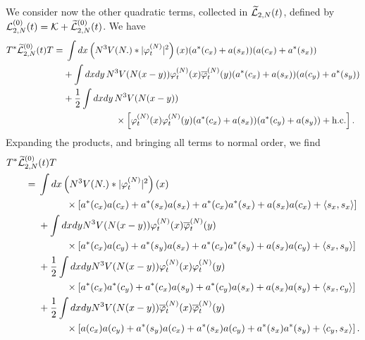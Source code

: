 \documentclass[11pt,a4paper]{article}
\newcommand{\wt}{\widetilde}
\newcommand{\cK}{{\cal K}}
\newcommand{\cL}{{\cal L}}
\begin{document}
We consider now the other quadratic terms, collected in $\wt{\cL}_{2,N} (t)$, defined by $\cL^{(0)}_{2,N} (t) = \cK + \wt{\cL}_{2,N}^{(0)} (t)$. 
We have
\[ \begin{split} 
T^* \wt{\cL}_{2,N}^{(0)} (t) T = & \; \int dx \left( N^3 V (N .) * |\varphi_t^{(N)}|^2 \right) (x) (a^* (c_x) + a(s_x)) (a(c_x) + a^* (s_x)) \\ & + \int dx dy \, N^3 V(N(x-y)) \varphi_t^{(N)} (x) \overline{\varphi}_t^{(N)} (y) (a^* (c_x) + a(s_x)) (a (c_y) + a^* (s_y)) \\ &+ \frac{1}{2} \int dx dy \, N^3 V(N (x-y)) \\
&\hspace{2cm} \times \left[  \varphi_t^{(N)} (x) \varphi_t^{(N)} (y) (a^* (c_x) + a(s_x)) (a^* (c_y) + a (s_y)) + \text{h.c.}  \right]. 
\end{split} \]
Expanding the products, and bringing all terms to normal order, we find
\begin{equation}\label{eq:T2T} \begin{split} 
T^*  \wt{\cL}_{2,N}^{(0)}& (t) T \\ =\; & \int dx \left(N^3 V (N .) * |\varphi_t^{(N)}|^2 \right) (x) \\ &\hspace{1cm}\times \left[  a^* (c_x) a (c_x) + a^* (s_x) a (s_x) + a^* (c_x) a^* (s_x) + a(s_x) a(c_x) + \langle s_x , s_x \rangle \right] \\
&+ \int dx dy N^3 V (N (x-y)) \varphi_t^{(N)} (x) \overline{\varphi}_t^{(N)} (y) \\ &\hspace{1cm}\times  \left[ a^* (c_x) a(c_y) + a^* (s_y) a(s_x) + a^* (c_x) a^* (s_y) + a(s_x) a(c_y) + \langle s_x , s_y \rangle \right] \\
&+ \frac{1}{2} \int dx dy N^3 V(N (x-y)) \varphi_t^{(N)} (x) \varphi_t^{(N)} (y) \\ &\hspace{1cm}\times \left[ a^* (c_x) a^* (c_y) + a^* (c_x) a(s_y) + a^* (c_y) a (s_x) + a(s_x) a(s_y) + \langle s_x , c_y \rangle \right] \\
&+ \frac{1}{2} \int dx dy N^3 V(N (x-y)) \overline{\varphi}_t^{(N)} (x) \overline{\varphi}_t^{(N)} (y) \\ &\hspace{1cm}\times \left[ a (c_x) a (c_y) + a^* (s_y) a(c_x) +  a^* (s_x) a(c_y) + a^* (s_x) a^* (s_y) + \langle c_y , s_x \rangle \right]. 
\end{split} \end{equation}
\end{document}
